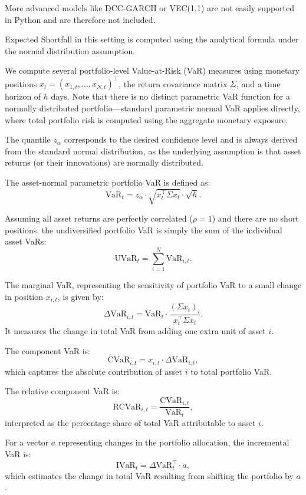 \documentclass[12pt]{article}
\begin{document}
More advanced models like DCC-GARCH or VEC(1,1) are not easily supported in Python and are therefore not included.

Expected Shortfall in this setting is computed using the analytical formula under the normal distribution assumption.


\vspace{1em}
\underline{}

\vspace{0.6em}

We compute several portfolio-level Value-at-Risk (VaR) measures using monetary positions $x_t = (x_{1,t}, \dots, x_{N,t})^\top$, the return covariance matrix $\Sigma$, and a time horizon of $h$ days. Note that there is no distinct parametric VaR function for a normally distributed portfolio—standard parametric normal VaR applies directly, where total portfolio risk is computed using the aggregate monetary exposure.

The quantile $z_\alpha$ corresponds to the desired confidence level and is always derived from the standard normal distribution, as the underlying assumption is that asset returns (or their innovations) are normally distributed.

The asset-normal parametric portfolio VaR is defined as:
\[
  \text{VaR}_t = z_\alpha \cdot \sqrt{x_t^\top \Sigma x_t} \cdot \sqrt{h}.
\]

Assuming all asset returns are perfectly correlated ($\rho = 1$) and there are no short positions, the undiversified portfolio VaR is simply the sum of the individual asset VaRs:
\[
  \text{UVaR}_t = \sum_{i=1}^N \text{VaR}_{i,t}.
\]

The marginal VaR, representing the sensitivity of portfolio VaR to a small change in position $x_{i,t}$, is given by:
\[
  \Delta \text{VaR}_{i,t} = \text{VaR}_t \cdot \frac{(\Sigma x_t)_i}{x_t^\top \Sigma x_t}.
\]
It measures the change in total VaR from adding one extra unit of asset $i$.

The component VaR is:
\[
  \text{CVaR}_{i,t} = x_{i,t} \cdot \Delta \text{VaR}_{i,t},
\]
which captures the absolute contribution of asset $i$ to total portfolio VaR.

The relative component VaR is:
\[
  \text{RCVaR}_{i,t} = \frac{\text{CVaR}_{i,t}}{\text{VaR}_t},
\]
interpreted as the percentage share of total VaR attributable to asset $i$.

For a vector $a$ representing changes in the portfolio allocation, the incremental VaR is:
\[
  \text{IVaR}_t = \Delta \text{VaR}_t^\top \cdot a,
\]
which estimates the change in total VaR resulting from shifting the portfolio by $a$.
\end{document}
